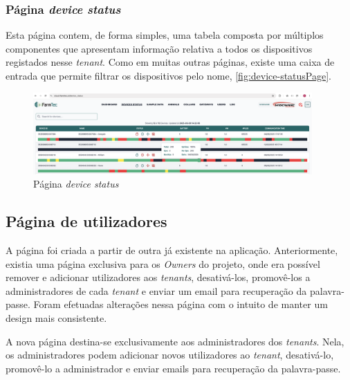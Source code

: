 \subsubsection{\textbf{Página \textit{device status}}}

Esta página contem, de forma simples, uma tabela composta por múltiplos componentes que apresentam informação relativa a todos os dispositivos registados nesse \textit{tenant}. Como em muitas outras páginas, existe uma caixa de entrada que permite filtrar os dispositivos pelo nome, \autoref{fig:device-statusPage}.

\begin{figure}[h!]
    \centering
    \includegraphics[width=0.95\textwidth]{figs/device_status_page.png}
    \caption{Página \textit{device status}}
    \label{fig:device-statusPage}
\end{figure}

\subsection{Página de utilizadores} 
A página foi criada a partir de outra já existente na aplicação. Anteriormente, existia uma página exclusiva para os \textit{Owners} do projeto, onde era possível remover e adicionar utilizadores aos \textit{tenants}, desativá-los, promovê-los a administradores de cada \textit{tenant} e enviar um email para recuperação da palavra-passe. Foram efetuadas alterações nessa página com o intuito de manter um design mais consistente.

A nova página destina-se exclusivamente aos administradores dos \textit{tenants}. Nela, os administradores podem adicionar novos utilizadores ao \textit{tenant}, desativá-lo, promovê-lo a administrador e enviar emails para recuperação da palavra-passe.

